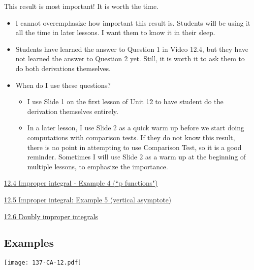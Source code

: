 \documentclass[11pt]{article}
\newcommand{\nl}{\hfill \vspace{-1.1\baselineskip}} %
\newcommand{\viv}{\hspace{8mm} \href{https://www.youtube.com/watch?v=LVKdfkNyp58&list=PLlwePzQY_wW-OVbBuwbFDl8RB5kt2Tngo&index=4}{12.4 Improper integral - Example 4 (``p functions")
}}
\newcommand{\vv}{\hspace{8mm} \href{https://www.youtube.com/watch?v=l0bYj2g9qqM&list=PLlwePzQY_wW-OVbBuwbFDl8RB5kt2Tngo&index=5}{12.5 Improper integral: Example 5 (vertical asymptote)}}
\newcommand{\vvi}{\hspace{8mm} \href{https://www.youtube.com/watch?v=WAhjLIfNnjI&list=PLlwePzQY_wW-OVbBuwbFDl8RB5kt2Tngo&index=6}{12.6 Doubly improper integrals}}
\begin{document}
\begin{warning}
This result is most important!  It is worth the time.
\end{warning}

\begin{comments}
\nl
	\begin{itemize}
		\item   I cannot overemphasize how important this result is.  Students will be using it all the time in later lessons.  I want them to know it in their sleep.
		\item Students have learned the answer to Question 1 in Video 12.4, but they have not learned the answer to Question 2 yet.   Still, it is worth it to ask them to do both derivations themselves.
		\item When do I use these questions?
			\begin{itemize}
				\item  I use Slide 1 on the first lesson of Unit 12 to have student do the derivation themselves entirely.
				\item  In a later lesson, I use Slide 2 as a quick warm up before we start doing computations with comparison tests.  If they do not know this result, there is no point in attempting to use Comparison Test, so it is a good reminder.  Sometimes I will use Slide 2 as a warm up at the beginning of multiple lessons, to emphasize the importance.
			\end{itemize}
	\end{itemize}
\end{comments}

\begin{videos}
\viv

\vv

\vvi
\end{videos}

\newpage
\subsection{Examples}

\begin{center}
{ \texttt{[image: 137-CA-12.pdf]}} 
\end{center}
\end{document}

